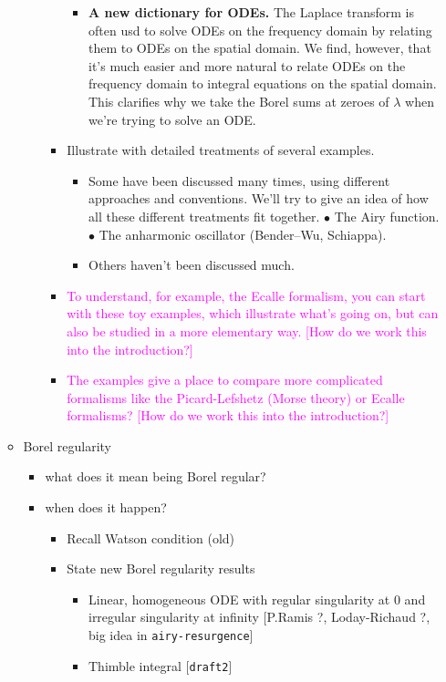 \documentclass{article}
\begin{document}
\begin{enumerate}
\begin{itemize}
\begin{itemize}
\begin{itemize}
\begin{itemize}
\item \textbf{A new dictionary for ODEs.} The Laplace transform is often usd to solve ODEs on the frequency domain by relating them to ODEs on the spatial domain. We find, however, that it's much easier and more natural to relate ODEs on the frequency domain to integral equations on the spatial domain. This clarifies why we take the Borel sums at zeroes of $\lambda$ when we're trying to solve an ODE.
\end{itemize}
\item Illustrate with detailed treatments of several examples.
\begin{itemize}
\item Some have been discussed many times, using different approaches and conventions. We'll try to give an idea of how all these different treatments fit together. $\bullet$ The Airy function. $\bullet$ The anharmonic oscillator (Bender--Wu, Schiappa).
\item Others haven't been discussed much.
\end{itemize}
\item \textcolor{magenta}{To understand, for example, the Ecalle formalism, you can start with these toy examples, which illustrate what's going on, but can also be studied in a more elementary way. [How do we work this into the introduction?]}
\item \textcolor{magenta}{The examples give a place to compare more complicated formalisms like the Picard-Lefshetz (Morse theory) or Ecalle formalisms? [How do we work this into the introduction?]}
\end{itemize}
\end{itemize}
\item Borel regularity
\begin{itemize}
\item what does it mean being Borel regular?
\item when does it happen?
\begin{itemize}
\item Recall Watson condition (old)
\item State new Borel regularity results
\begin{itemize}
\item Linear, homogeneous ODE with regular singularity at 0 and irregular singularity at infinity [P.Ramis ?, Loday-Richaud ?, big idea in {\tt airy-resurgence}]
\item Thimble integral [{\tt draft2}]
\end{itemize}
\end{itemize}

\end{itemize}
\end{itemize}
\end{enumerate}
\end{document}
